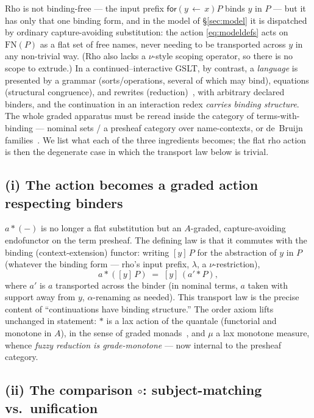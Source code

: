 \documentclass[11pt]{article}
\theoremstyle{plain}
\theoremstyle{definition}
\theoremstyle{remark}
\newcommand{\for}[2]{\mathsf{for}(#1 \,{\leftarrow}\, #2)}
\newcommand{\act}{\mathbin{*}}
\newcommand{\cmp}{\mathbin{\circ}}       %
\newcommand{\meas}{\mu}
\newcommand{\FN}{\mathrm{FN}}
\begin{document}
Rho is not binding-free --- the input prefix $\for{y}{x}P$ binds $y$ in $P$ --- but it has only that
one binding form, and in the model of \S\ref{sec:model} it is dispatched by ordinary capture-avoiding
substitution: the action \eqref{eq:modeldefs} acts on $\FN(P)$ as a flat set of free names, never
needing to be transported across $y$ in any non-trivial way. (Rho also lacks a $\nu$-style scoping
operator, so there is no scope to extrude.) In a continued--interactive GSLT, by contrast, a
\emph{language} is presented by a grammar (sorts/operations, several of which may bind), equations
(structural congruence), and rewrites (reduction)~\cite{nslogic,ntt,gslt}, with arbitrary declared
binders, and the continuation in an interaction redex \emph{carries binding structure}. The whole
graded apparatus must be reread inside the category of terms-with-binding --- nominal sets / a
presheaf category over name-contexts, or de~Bruijn families~\cite{gabbaypitts,pitts,fpt}. We list
what each of the three ingredients becomes; the flat rho action is then the degenerate case in which
the transport law below is trivial.

\subsection{(i) The action becomes a graded action respecting binders}

$a\act(-)$ is no longer a flat substitution but an $A$-graded, capture-avoiding endofunctor on the
term presheaf. The defining law is that it commutes with the binding (context-extension) functor:
writing $[y]\,P$ for the abstraction of $y$ in $P$ (whatever the binding form --- rho's input prefix,
$\lambda$, a $\nu$-restriction),
\[
a\act([y]\,P)\;=\;[y]\,(a'\act P),
\]
where $a'$ is $a$ transported across the binder (in nominal terms, $a$ taken with support away from
$y$, $\alpha$-renaming as needed). This transport law is the precise content of ``continuations have
binding structure.'' The order axiom lifts unchanged in statement: $\act$ is a lax action of the
quantale (functorial and monotone in $A$), in the sense of graded monads~\cite{katsumata}, and $\meas$
a lax monotone measure, whence \emph{fuzzy reduction is grade-monotone} --- now internal to the
presheaf category.

\subsection{(ii) The comparison $\cmp$: subject-matching vs.\ unification}
\end{document}
